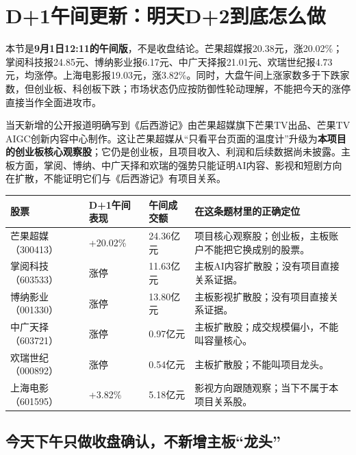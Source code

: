 \section{D+1午间更新：明天D+2到底怎么做}

\begin{sourcequalitybox}[先看今天已经发生的事]
本节是\textbf{9月1日12:11的午间版}，不是收盘结论。芒果超媒报20.38元，涨20.02\%；掌阅科技报24.85元、博纳影业报6.17元、中广天择报21.01元、欢瑞世纪报4.73元，均涨停。上海电影报19.03元，涨3.82\%。同时，大盘午间上涨家数多于下跌家数，但创业板、科创板下跌；市场状态仍应按防御性轮动理解，不能把今天的涨停直接当作全面进攻市。
\end{sourcequalitybox}

当天新增的公开报道明确写到《后西游记》由芒果超媒旗下芒果TV出品、芒果TV AIGC创新内容中心制作。这让芒果超媒从“只看平台页面的温度计”升级为\textbf{本项目的创业板核心观察股}；它仍是创业板，且项目收入、利润和后续数据尚未披露。主板方面，掌阅、博纳、中广天择和欢瑞的强势只能证明AI内容、影视和短剧方向在扩散，不能证明它们与《后西游记》有项目关系。

\begin{exhibitbox}
\begin{tabularx}{\textwidth}{L{2.5cm}L{1.6cm}L{1.8cm}X}
\toprule
股票 & D+1午间表现 & 午间成交额 & 在这条题材里的正确定位 \\
\midrule
芒果超媒（300413） & +20.02\% & 24.36亿元 & 项目核心观察股；创业板，主板账户不能把它换成别的股票。 \\
掌阅科技（603533） & 涨停 & 11.63亿元 & 主板AI内容扩散股；没有项目直接关系证据。 \\
博纳影业（001330） & 涨停 & 13.80亿元 & 主板影视扩散股；没有项目直接关系证据。 \\
中广天择（603721） & 涨停 & 0.97亿元 & 主板扩散股；成交规模偏小，不能叫容量核心。 \\
欢瑞世纪（000892） & 涨停 & 0.54亿元 & 主板扩散股；不能叫项目龙头。 \\
上海电影（601595） & +3.82\% & 5.18亿元 & 影视方向跟随观察；当下不属于本项目关系股。 \\
\bottomrule
\end{tabularx}
\end{exhibitbox}

\subsection*{今天下午只做收盘确认，不新增主板“龙头”}

